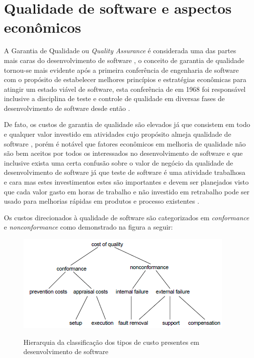 \documentclass[
	12pt,				%
	oneside,			%
	a4paper,			%
	english,			%
	brazil				%
	]{abntex2ppgsi}
\begin{document}
\section{Qualidade de software e aspectos econômicos}

A Garantia de Qualidade ou \textit{Quality Assurance} é considerada uma das partes mais caras do desenvolvimento de software \cite{wagner2005}, o conceito de garantia de qualidade tornou-se mais evidente após a primeira conferência de engenharia de software com o propósito de estabelecer melhores princípios e estratégias econômicas para atingir um estado viável de software, esta conferência de em 1968 foi responsável	 inclusive a disciplina de teste e controle de qualidade em diversas  fases de desenvolvimento de software desde então \cite{repasi2009}.

De fato, os custos de garantia de qualidade são elevados \cite{wagner2005} \cite{Korel1990} já que consistem em todo e qualquer valor investido em atividades cujo propósito almeja qualidade de software \cite{pressman2009engenharia}, porém é notável que fatores econômicos em melhoria de qualidade não são bem aceitos por todos os interessados no desenvolvimento de software e que inclusive exista uma certa confusão sobre o valor de negócio da qualidade de desenvolvimento de software \cite{slaughter1998} já que teste de software é uma atividade trabalhosa e cara \cite{Korel1990} mas estes investimentos estes são importantes e devem ser planejados visto que cada valor gasto em horas de trabalho e não investido em retrabalho pode ser usado para melhorias rápidas em produtos e processo existentes \cite{slaughter1998}.

Os custos direcionados à qualidade de software são categorizados em \textit{conformance} e \textit{nonconformance} \cite{ slaughter1998}\cite{pressman2009engenharia} como demonstrado na figura a seguir: 

\begin{figure}[H]%
	\centering
 	  \caption{Hierarquia da classificação dos tipos de custo presentes em desenvolvimento de software}
		\includegraphics{tipos-custo-arvore.png}
	\label{fig:tipos-custo-arvore}
\end{figure}
\end{document}
